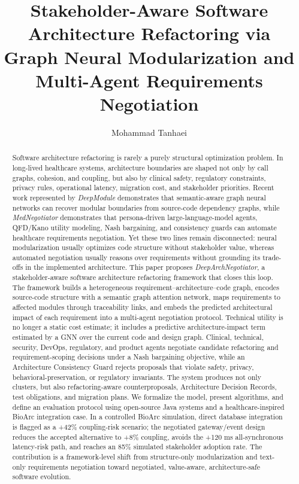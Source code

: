 \documentclass[english,preprint,nonatbib]{elsarticle}
\begin{document}
\begin{frontmatter}

\title{\textbf{Stakeholder-Aware Software Architecture Refactoring via Graph Neural Modularization and Multi-Agent Requirements Negotiation}}

\author{Mohammad Tanhaei}
\address{Department of Engineering, Ilam University, Ilam, Iran}

\begin{abstract}
Software architecture refactoring is rarely a purely structural optimization problem.
In long-lived healthcare systems, architecture boundaries are shaped not only by call graphs, cohesion, and coupling, but also by clinical safety, regulatory constraints, privacy rules, operational latency, migration cost, and stakeholder priorities.
Recent work represented by \emph{DeepModule} demonstrates that semantic-aware graph neural networks can recover modular boundaries from source-code dependency graphs, while \emph{MedNegotiator} demonstrates that persona-driven large-language-model agents, QFD/Kano utility modeling, Nash bargaining, and consistency guards can automate healthcare requirements negotiation.
Yet these two lines remain disconnected: neural modularization usually optimizes code structure without stakeholder value, whereas automated negotiation usually reasons over requirements without grounding its trade-offs in the implemented architecture.
This paper proposes \emph{DeepArchNegotiator}, a stakeholder-aware software architecture refactoring framework that closes this loop.
The framework builds a heterogeneous requirement--architecture--code graph, encodes source-code structure with a semantic graph attention network, maps requirements to affected modules through traceability links, and embeds the predicted architectural impact of each requirement into a multi-agent negotiation protocol.
Technical utility is no longer a static cost estimate; it includes a predictive architecture-impact term estimated by a GNN over the current code and design graph.
Clinical, technical, security, DevOps, regulatory, and product agents negotiate candidate refactoring and requirement-scoping decisions under a Nash bargaining objective, while an Architecture Consistency Guard rejects proposals that violate safety, privacy, behavioral-preservation, or regulatory invariants.
The system produces not only clusters, but also refactoring-aware counterproposals, Architecture Decision Records, test obligations, and migration plans.
We formalize the model, present algorithms, and define an evaluation protocol using open-source Java systems and a healthcare-inspired BioArc integration case.
In a controlled BioArc simulation, direct database integration is flagged as a +42\% coupling-risk scenario; the negotiated gateway/event design reduces the accepted alternative to +8\% coupling, avoids the +120 ms all-synchronous latency-risk path, and reaches an 85\% simulated stakeholder adoption rate.
The contribution is a framework-level shift from structure-only modularization and text-only requirements negotiation toward negotiated, value-aware, architecture-safe software evolution.
\end{abstract}


\end{frontmatter}
\end{document}
